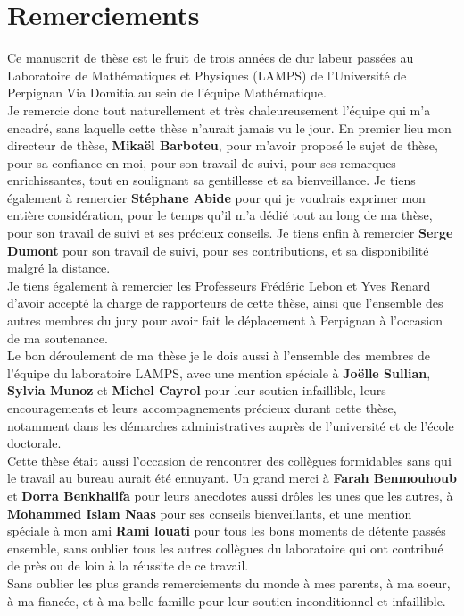 {}
{}
\chapter*{Remerciements}

Ce manuscrit de thèse est le fruit de trois années de dur labeur passées au Laboratoire de Mathématiques et Physiques (LAMPS) de l'Université de Perpignan Via Domitia au sein de l'équipe Mathématique.\\

Je remercie donc tout naturellement et très chaleureusement l’équipe qui m’a encadré, sans laquelle cette thèse n’aurait jamais vu le jour. En premier lieu mon directeur de thèse, \textbf{Mikaël Barboteu}, pour m'avoir proposé le sujet de thèse, pour sa confiance en moi, pour son travail de suivi, pour ses remarques enrichissantes, tout en soulignant sa gentillesse et sa bienveillance. Je tiens également à remercier \textbf{Stéphane Abide} pour qui je voudrais exprimer mon entière considération, pour le temps qu'il m'a dédié tout au long de ma thèse, pour son travail de suivi et ses précieux conseils. Je tiens enfin à remercier \textbf{Serge Dumont} pour son travail de suivi, pour ses contributions, et sa disponibilité malgré la distance.\\

Je tiens également à remercier les Professeurs Frédéric Lebon et Yves Renard d'avoir accepté la charge de rapporteurs de cette thèse, ainsi que l'ensemble des autres membres du jury pour avoir fait le déplacement à Perpignan à l'occasion de ma soutenance.\\
Le bon déroulement de ma thèse je le dois aussi à l’ensemble des membres de l’équipe du laboratoire LAMPS, avec une mention spéciale à \textbf{Joëlle Sullian}, \textbf{Sylvia Munoz} et \textbf{Michel Cayrol} pour leur soutien infaillible, leurs encouragements et leurs accompagnements précieux durant cette thèse, notamment dans les démarches administratives auprès de l'université et de l'école doctorale.\\

Cette thèse était aussi l’occasion de rencontrer des collègues formidables sans qui le travail au bureau aurait été ennuyant. Un grand merci à \textbf{Farah Benmouhoub} et \textbf{Dorra Benkhalifa} pour leurs anecdotes aussi drôles les unes que les autres, à \textbf{Mohammed Islam Naas} pour ses conseils bienveillants, et une mention spéciale à mon ami \textbf{Rami louati} pour tous les bons moments de détente passés ensemble, sans oublier tous les autres collègues du laboratoire qui ont contribué de près ou de loin à la réussite de ce travail.\\

Sans oublier les plus grands remerciements du monde à mes parents, à ma soeur, à ma fiancée, et à ma belle famille pour leur soutien inconditionnel et infaillible.


%

